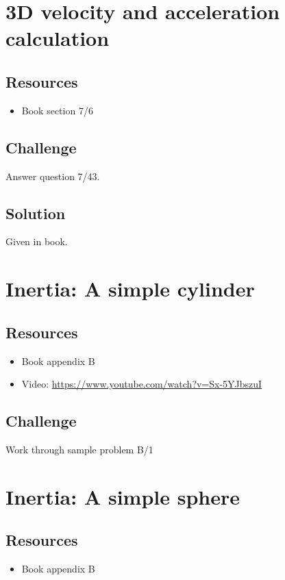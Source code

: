 \newpage
\section{3D velocity and acceleration calculation}

\subsection*{Resources}
\begin{itemize}
    \item Book section 7/6
\end{itemize}

\subsection*{Challenge}
Answer question 7/43.

\subsection*{Solution}
Given in book.




\newpage
\section{Inertia: A simple cylinder}

\subsection*{Resources}
\begin{itemize}
    \item Book appendix B
    \item Video: \url{https://www.youtube.com/watch?v=Sx-5YJbszuI}
\end{itemize}

\subsection*{Challenge}
Work through sample problem B/1




\newpage
\section{Inertia: A simple sphere}

\subsection*{Resources}
\begin{itemize}
    \item Book appendix B
\end{itemize}

